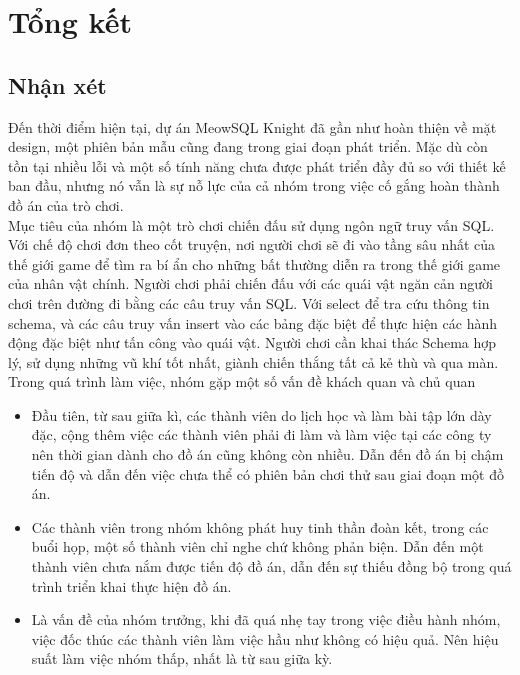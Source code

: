 \section{Tổng kết}
\subsection{Nhận xét}
\hspace*{1cm} Đến thời điểm hiện tại, dự án MeowSQL Knight đã gần như hoàn thiện về mặt design, một phiên bản mẫu cũng đang trong giai đoạn phát triển. Mặc dù còn tồn tại nhiều lỗi và một số tính năng chưa được phát triển đầy đủ so với thiết kế ban đầu, nhưng nó vẫn là sự nỗ lực của cả nhóm trong việc cố gắng hoàn thành đồ án của trò chơi.\\
\hspace*{1cm} Mục tiêu của nhóm là một trò chơi chiến đấu sử dụng ngôn ngữ truy vấn SQL. Với chế độ chơi đơn theo cốt truyện, nơi người chơi sẽ đi vào tầng sâu nhất của thế giới game để tìm ra bí ẩn cho những bất thường diễn ra trong thế giới game của nhân vật chính. Người chơi phải chiến đấu với các quái vật ngăn cản người chơi trên đường đi bằng các câu truy vấn SQL. Với select để tra cứu thông tin schema, và các câu truy vấn insert vào các bảng đặc biệt để thực hiện các hành động đặc biệt như tấn công vào quái vật. Người chơi cần khai thác Schema hợp lý, sử dụng những vũ khí tốt nhất, giành chiến thắng tất cả kẻ thù và qua màn.\\
\hspace*{1cm} Trong quá trình làm việc, nhóm gặp một số vấn đề khách quan và chủ quan
\begin{itemize}
	\item Đầu tiên, từ sau giữa kì, các thành viên do lịch học và làm bài tập lớn dày đặc, cộng thêm việc các thành viên phải đi làm và làm việc tại các công ty nên thời gian dành cho đồ án cũng không còn nhiều. Dẫn đến đồ án bị chậm tiến độ và dẫn đến việc chưa thể có phiên bản chơi thử sau giai đoạn một đồ án.
	\item Các thành viên trong nhóm không phát huy tinh thần đoàn kết, trong các buổi họp, một số thành viên chỉ nghe chứ không phản biện. Dẫn đến một thành viên chưa nắm được tiến độ đồ án, dẫn đến sự thiếu đồng bộ trong quá trình triển khai thực hiện đồ án.
	\item Là vấn đề của nhóm trưởng, khi đã quá nhẹ tay trong việc điều hành nhóm, việc đốc thúc các thành viên làm việc hầu như không có hiệu quả. Nên hiệu suất làm việc nhóm thấp, nhất là từ sau giữa kỳ.
\end{itemize}
